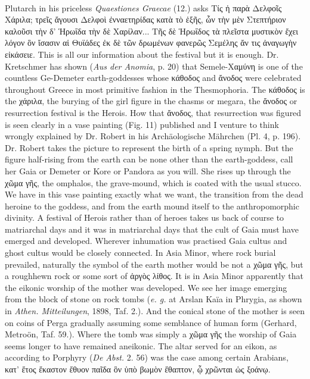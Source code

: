 \documentclass[a4paper, 11pt, oneside, polutonikogreek, english]{article}
\begin{document}
\paragraph{}
Plutarch in his priceless \emph{Quaestiones Graecae} (12.) asks Τίς ἡ παρὰ Δελφοῖς Χάριλα; τρεῖς ἄγουσι Δελφοὶ ἐνναετηρίδας κατὰ τὸ ἑξῆς, ὧν τὴν μὲν Στεπτήριον καλοῦσι τὴν δ' Ἡρωΐδα τὴν δὲ Χαρίλαν... Τῆς δὲ Ἡρωΐδος τὰ πλεῖστα μυστικὸν ἔχει λόγον ὃν ἴσασιν αἱ Θυϊάδες ἐκ δὲ τῶν δρωμένων φανερῶς Σεμέλης ἄν τις ἀναγωγὴν εἰκάσειε. This is all our information about the festival but it is enough. Dr. Kretschmer has shown (\emph{Aus der Anomia}, p. 20) that Semele-Χαμύνη is one of the countless Ge-Demeter earth-goddesses whose κάθοδος and ἄνοδος were celebrated throughout Greece in most primitive fashion in the Thesmophoria. The κάθοδος is the χάριλα, the burying of the girl figure in the chasms or megara, the ἄνοδος or resurrection festival is the Herois. How that ἄνοδος, that resurrection was figured is seen clearly in a vase painting (Fig. 11) published and I venture to think wrongly explained by Dr. Robert in his Archäologische Mährchen (Pl. 4, p. 196). Dr. Robert takes the picture to represent the birth of a spring nymph. But the figure half-rising from the earth can be none other than the earth-goddess, call her Gaia or Demeter or Kore or Pandora as you will. She rises up through the χῶμα γῆς, the omphalos, the grave-mound, which is coated with the usual stucco. We have in this vase painting exactly what we want, the transition from the dead heroine to the goddess, and from the earth mound itself to the anthropomorphic divinity. A festival of Herois rather than of heroes takes us back of course to matriarchal days and it was in matriarchal days that the cult of Gaia must have emerged and developed. Wherever inhumation was practised Gaia cultus and ghost cultus would be closely connected. In Asia Minor, where rock burial prevailed, naturally the symbol of the earth mother would be not a χῶμα γῆς, but a roughhewn rock or some sort of ἀργὸς λίθος. It is in Asia Minor apparently that the eikonic worship of the mother was developed. We see her image emerging from the block of stone on rock tombs (\emph{e. g.} at Arslan Kaïa in Phrygia, as shown in \emph{Athen. Mitteilungen}, 1898, Taf. 2.). And the conical stone of the mother is seen on coins of Perga gradually assuming some semblance of human form (Gerhard, Metroön, Taf. 59.). Where the tomb was simply a χῶμα γῆς the worship of Gaia seems longer to have remained aneikonic. The altar served for an eikon, as according to Porphyry (\emph{De Abst.} 2. 56) was the case among certain Arabians, κατ' ἔτος ἕκαστον ἔθυον παῖδα ὃν ὑπὸ βωμὸν ἔθαπτον, ᾧ χρῶνται ὡς ξοάνῳ.
\end{document}
